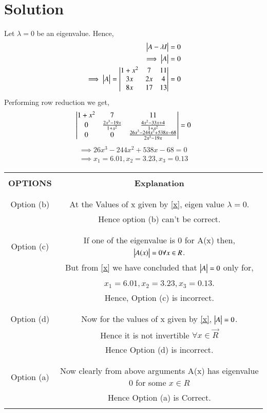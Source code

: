 \documentclass[journal,12pt,twocolumn]{IEEEtran}
\begin{document}
\section{Solution}
Let $\lambda = 0$ be an eigenvalue. Hence,
\begin{align}
\begin{vmatrix}A-\lambda I\end{vmatrix} = 0\\
\implies \begin{vmatrix}A\end{vmatrix} = 0 \\
\implies \begin{vmatrix}A\end{vmatrix} = \begin{vmatrix}1+x^2&7&11\\3x&2x&4\\8x&17&13\end{vmatrix} = 0
\end{align}
Performing row reduction we get,
\begin{align}
\begin{vmatrix}1+x^2&7&11\\0&\frac{2x^3 - 19x}{1+x^2}&\frac{4x^2 - 33x +4}{1+x^2}\\0&0&\frac{26x^3 - 244x^2 + 538x - 68}{2x^3 - 19x}\end{vmatrix} = 0
\end{align}
\begin{align}
\implies 26 x^3 - 244 x^2 + 538 x - 68 = 0\\
\implies x_1 = 6.01, x_2 = 3.23, x_3 = 0.13
\label{x}
\end{align} 
\begin{table}[h!]
\begin{center}
\resizebox{\columnwidth}{!}
{
\begin{tabular}{|c|c|}
\hline
& \\
\textbf{OPTIONS} & \textbf{Explanation}\\
&\\
\hline
& \\
Option (b) & At the Values of x given by \eqref{x}, eigen value $\lambda = 0$. \\ &
Hence option (b) can't be correct.\\
&\\
\hline
& \\
Option (c) & If one of the eigenvalue is 0 for A(x) then, $\begin{vmatrix}A(x)\end{vmatrix} = 0 \forall x \in R$.\\ & 
But from \eqref{x} we have concluded that $\begin{vmatrix}A\end{vmatrix} = 0$ only for, 
\\& $x_1 = 6.01, x_2 = 3.23, x_3 = 0.13$.\\ &
Hence, Option (c) is incorrect.\\
& \\
\hline
& \\
Option (d) & Now for the values of x given by \eqref{x}, $\begin{vmatrix}A\end{vmatrix} = 0$. \\ &
Hence it is not invertible $\forall x\in \vec{R}$ \\&
Hence Option (d) is incorrect. \\ 
& \\
\hline
& \\
Option (a) & Now clearly from above arguments A(x) has eigenvalue 0 for some $x \in R$  \\&
Hence Option (a) is Correct. \\ 
& \\
\hline

\end{tabular}
}
\end{center}
\end{table}
\end{document}
